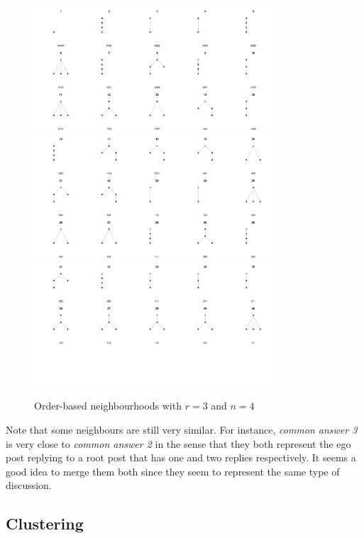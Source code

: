 \documentclass[9pt,technote]{IEEEtran}
\begin{document}
\begin{figure}
	\centering
	\includegraphics[width=0.8\textwidth]{neighbourhoods_3_4_1}
	\includegraphics[width=0.8\textwidth]{neighbourhoods_3_4_2}
	\includegraphics[width=0.8\textwidth]{neighbourhoods_3_4_3}
	\caption{Order-based neighbourhoods with $r=3$ and $n=4$}
	\label{fig:neighbourhoods_4_4}
\end{figure}


Note that some neighbours are still very similar. For instance, \textit{common answer 3} is very close to \textit{common answer 2} in the sense that they both represent the ego post replying to a root post that has one and two replies respectively. It seems a good idea to merge them both since they seem to represent the same type of discussion.

\subsection{Clustering}
\end{document}
